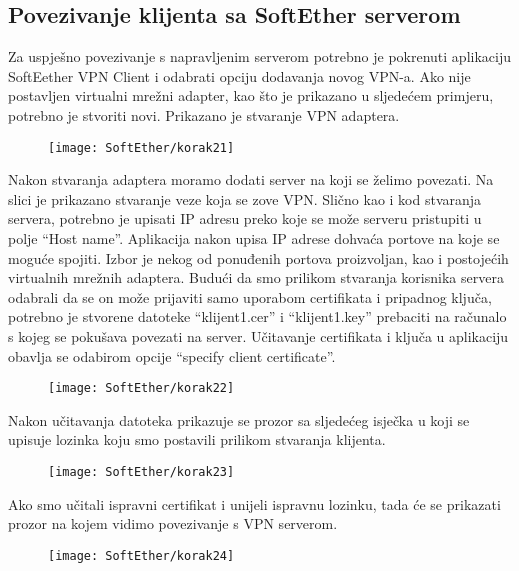 \subsection*{Povezivanje klijenta sa SoftEther serverom}
\hspace{0.5cm}
Za uspješno povezivanje s napravljenim serverom potrebno je pokrenuti aplikaciju SoftEether VPN Client i odabrati opciju dodavanja novog VPN-a. Ako nije postavljen virtualni mrežni adapter, kao što je prikazano u sljedećem primjeru, potrebno je stvoriti novi. Prikazano je stvaranje VPN adaptera.
\begin{figure}[h!]
     \centering
     \texttt{[image: SoftEther/korak21]}
\end{figure}
\FloatBarrier
Nakon stvaranja adaptera moramo dodati server na koji se želimo povezati. Na slici je prikazano stvaranje veze koja se zove VPN. Slično kao i kod stvaranja servera, potrebno je upisati IP adresu preko koje se može serveru pristupiti u polje ``Host name''. Aplikacija nakon upisa IP adrese dohvaća portove na koje se moguće spojiti. Izbor je nekog od ponuđenih portova proizvoljan, kao i postojećih virtualnih mrežnih adaptera. Budući da smo prilikom stvaranja korisnika servera odabrali da se on može prijaviti samo uporabom certifikata i pripadnog ključa, potrebno je stvorene datoteke ``klijent1.cer'' i ``klijent1.key'' prebaciti na računalo s kojeg se pokušava povezati na server. Učitavanje certifikata i ključa u aplikaciju obavlja se odabirom opcije ``specify client certificate''.
\begin{figure}[h!]
     \centering
     \texttt{[image: SoftEther/korak22]}
\end{figure}
\FloatBarrier
Nakon učitavanja datoteka prikazuje se prozor sa sljedećeg isječka u koji se upisuje lozinka koju smo postavili prilikom stvaranja klijenta.
\begin{figure}[h!]
     \centering
     \texttt{[image: SoftEther/korak23]}
\end{figure}
\FloatBarrier
Ako smo učitali ispravni certifikat i unijeli ispravnu lozinku, tada će se prikazati prozor na kojem vidimo povezivanje s VPN serverom.
\begin{figure}[h!]
     \centering
     \texttt{[image: SoftEther/korak24]}
\end{figure}
\FloatBarrier

\FloatBarrier

